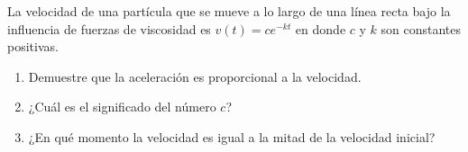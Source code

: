 \item La velocidad de una partícula que se mueve a lo largo de una línea recta bajo la influencia de fuerzas de viscosidad es $v(t) = c e^{-kt}$ en donde $c$ y $k$ son constantes positivas.
\begin{enumerate}
    \item[(a)] Demuestre que la aceleración es proporcional a la velocidad.
    \item[(b)] ¿Cuál es el significado del número $c$?
    \item[(c)] ¿En qué momento la velocidad es igual a la mitad de la velocidad inicial?
\end{enumerate}
